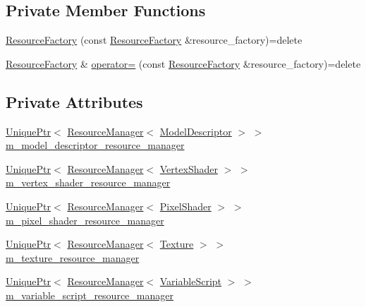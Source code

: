 \subsection*{Private Member Functions}
\begin{DoxyCompactItemize}
\item 
\hyperlink{classmage_1_1_resource_factory_ac2d236ed7dc16f4ab87d9d8e95d78a94}{Resource\+Factory} (const \hyperlink{classmage_1_1_resource_factory}{Resource\+Factory} \&resource\+\_\+factory)=delete
\item 
\hyperlink{classmage_1_1_resource_factory}{Resource\+Factory} \& \hyperlink{classmage_1_1_resource_factory_a1a99724dd744fde5ce2a1488966b30d0}{operator=} (const \hyperlink{classmage_1_1_resource_factory}{Resource\+Factory} \&resource\+\_\+factory)=delete
\end{DoxyCompactItemize}
\subsection*{Private Attributes}
\begin{DoxyCompactItemize}
\item 
\hyperlink{namespacemage_a8c307fbcc33bce9b7f2aa4c26c3b95cf}{Unique\+Ptr}$<$ \hyperlink{classmage_1_1_resource_manager}{Resource\+Manager}$<$ \hyperlink{classmage_1_1_model_descriptor}{Model\+Descriptor} $>$ $>$ \hyperlink{classmage_1_1_resource_factory_a1e545bdec29a028ae913761f40d94c4c}{m\+\_\+model\+\_\+descriptor\+\_\+resource\+\_\+manager}
\item 
\hyperlink{namespacemage_a8c307fbcc33bce9b7f2aa4c26c3b95cf}{Unique\+Ptr}$<$ \hyperlink{classmage_1_1_resource_manager}{Resource\+Manager}$<$ \hyperlink{classmage_1_1_vertex_shader}{Vertex\+Shader} $>$ $>$ \hyperlink{classmage_1_1_resource_factory_ade034e4c307e9df35e4275329373a2b7}{m\+\_\+vertex\+\_\+shader\+\_\+resource\+\_\+manager}
\item 
\hyperlink{namespacemage_a8c307fbcc33bce9b7f2aa4c26c3b95cf}{Unique\+Ptr}$<$ \hyperlink{classmage_1_1_resource_manager}{Resource\+Manager}$<$ \hyperlink{classmage_1_1_pixel_shader}{Pixel\+Shader} $>$ $>$ \hyperlink{classmage_1_1_resource_factory_affcd4a93cd82979beca8c7daab7c3501}{m\+\_\+pixel\+\_\+shader\+\_\+resource\+\_\+manager}
\item 
\hyperlink{namespacemage_a8c307fbcc33bce9b7f2aa4c26c3b95cf}{Unique\+Ptr}$<$ \hyperlink{classmage_1_1_resource_manager}{Resource\+Manager}$<$ \hyperlink{classmage_1_1_texture}{Texture} $>$ $>$ \hyperlink{classmage_1_1_resource_factory_a88e236e06faf339e2889bed8b817a196}{m\+\_\+texture\+\_\+resource\+\_\+manager}
\item 
\hyperlink{namespacemage_a8c307fbcc33bce9b7f2aa4c26c3b95cf}{Unique\+Ptr}$<$ \hyperlink{classmage_1_1_resource_manager}{Resource\+Manager}$<$ \hyperlink{classmage_1_1_variable_script}{Variable\+Script} $>$ $>$ \hyperlink{classmage_1_1_resource_factory_a51fe3cfa759588f7c740762abb8efc4f}{m\+\_\+variable\+\_\+script\+\_\+resource\+\_\+manager}
\end{DoxyCompactItemize}


